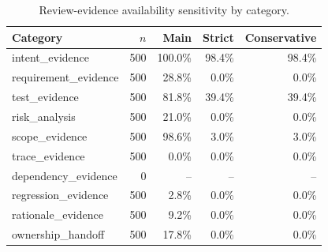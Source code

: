 \begin{table}[t]
\centering
\caption{Review-evidence availability sensitivity by category.}
\label{tab:availability-sensitivity}
\footnotesize
\begin{tabular}{@{}lrrrr@{}}
\toprule
Category & $n$ & Main & Strict & Conservative \\
\midrule
intent\_evidence & 500 & 100.0\% & 98.4\% & 98.4\% \\
requirement\_evidence & 500 & 28.8\% & 0.0\% & 0.0\% \\
test\_evidence & 500 & 81.8\% & 39.4\% & 39.4\% \\
risk\_analysis & 500 & 21.0\% & 0.0\% & 0.0\% \\
scope\_evidence & 500 & 98.6\% & 3.0\% & 3.0\% \\
trace\_evidence & 500 & 0.0\% & 0.0\% & 0.0\% \\
dependency\_evidence & 0 & -- & -- & -- \\
regression\_evidence & 500 & 2.8\% & 0.0\% & 0.0\% \\
rationale\_evidence & 500 & 9.2\% & 0.0\% & 0.0\% \\
ownership\_handoff & 500 & 17.8\% & 0.0\% & 0.0\% \\
\bottomrule
\end{tabular}
\end{table}
